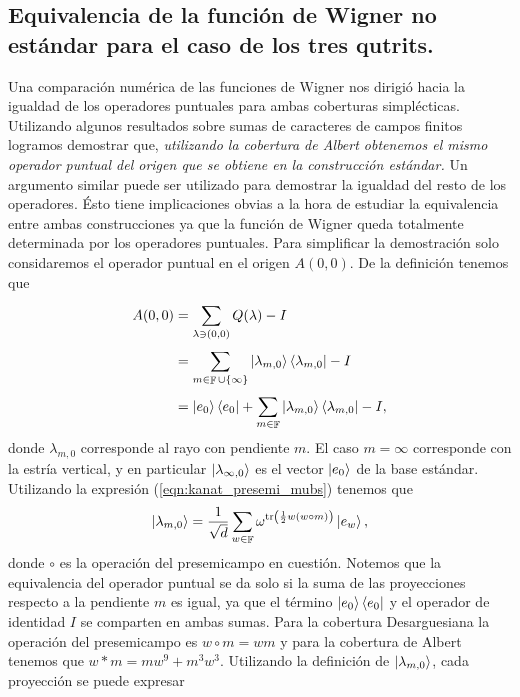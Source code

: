 \documentclass[a4paper,11pt]{report}
\DeclareMathOperator{\F}{\mathbb{F}}
\DeclareMathOperator{\tr}{tr}
\begin{document}
  \subsection{Equivalencia de la función de Wigner no
  estándar para el caso de los tres qutrits.}

  Una comparación numérica de las funciones de Wigner nos
  dirigió hacia la igualdad de los operadores puntuales para
  ambas coberturas simplécticas. Utilizando algunos
  resultados sobre sumas de caracteres de campos finitos
  logramos demostrar que, \textit{utilizando la cobertura de
  Albert obtenemos el mismo operador puntual del origen que
  se obtiene en la construcción estándar.}
  Un argumento similar puede ser utilizado para demostrar la
  igualdad del resto de los operadores. Ésto tiene
  implicaciones obvias a la hora de estudiar la equivalencia
  entre ambas construcciones ya que la función de Wigner
  queda totalmente determinada por los operadores puntuales.
  Para simplificar la demostración solo considaremos el
  operador puntual en el origen $A(0,0)$. De la definición
  tenemos que
  \begin{align}
    A(0,0)
    &= \sum_{\lambda \ni (0,0)}^{} Q(\lambda) - I \\
    &= \sum_{m \in \F \cup \{\infty\}}^{} \ket{\lambda_{m,0}}
    \bra{\lambda_{m,0}} - I \\
    &= \ket{e_0}\bra{e_0}
    + \sum_{m \in \F}^{}
    \ket{\lambda_{m,0}}\bra{\lambda_{m,0}} - I,
  \end{align}
  donde $\lambda_{m,0}$ corresponde al rayo con pendiente
  $m$. El caso $m = \infty$ corresponde con la estría
  vertical, y en particular $\ket{\lambda_{\infty,0}}$ es el
  vector $\ket{e_0}$ de la base estándar. Utilizando la
  expresión (\ref{eqn:kanat_presemi_mubs}) tenemos que
  \begin{equation}
    \ket{\lambda_{m,0}}
    = \frac{1}{\sqrt{d}} \sum_{w \in \F}^{}
    \omega^{\tr\left( \frac{1}{2} w(w\circ m) \right) }
    \ket{e_w},
  \end{equation}
  donde $\circ$ es la operación del presemicampo en
  cuestión. Notemos que la equivalencia del operador puntual
  se da solo si la suma de las proyecciones respecto a la
  pendiente $m$ es igual, ya que el término
  $\ket{e_0}\bra{e_0}$ y el operador de identidad $I$ se
  comparten en ambas sumas.  Para la cobertura Desarguesiana
  la operación del presemicampo es $w \circ m = wm$ y para
  la cobertura de Albert tenemos que $w * m = mw^{9} +
  m^3 w^3$.  Utilizando la definición de
  $\ket{\lambda_{m,0}}$, cada proyección se puede expresar
\end{document}
